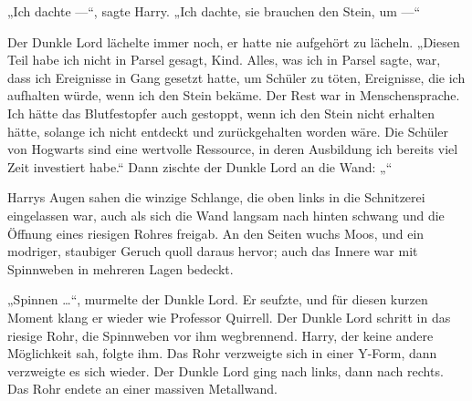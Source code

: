 „Ich dachte —“, sagte Harry.
„Ich dachte, sie brauchen den Stein, um —“

Der Dunkle Lord lächelte immer noch, er hatte nie aufgehört zu lächeln.
„Diesen Teil habe ich nicht in Parsel gesagt, Kind. Alles, was ich in Parsel sagte, war, dass ich Ereignisse in Gang gesetzt hatte, um Schüler zu töten, Ereignisse, die ich aufhalten würde, wenn ich den Stein bekäme. Der Rest war in Menschensprache. Ich hätte das Blutfestopfer auch gestoppt, wenn ich den Stein nicht erhalten hätte, solange ich nicht entdeckt und zurückgehalten worden wäre. Die Schüler von Hogwarts sind eine wertvolle Ressource, in deren Ausbildung ich bereits viel Zeit investiert habe.“
Dann zischte der Dunkle Lord an die Wand:
„“

Harrys Augen sahen die winzige Schlange, die oben links in die Schnitzerei eingelassen war, auch als sich die Wand langsam nach hinten schwang und die Öffnung eines riesigen Rohres freigab. An den Seiten wuchs Moos, und ein modriger, staubiger Geruch quoll daraus hervor; auch das Innere war mit Spinnweben in mehreren Lagen bedeckt.

„Spinnen …“, murmelte der Dunkle Lord.
Er seufzte, und für diesen kurzen Moment klang er wieder wie Professor Quirrell.
Der Dunkle Lord schritt in das riesige Rohr, die Spinnweben vor ihm wegbrennend. Harry, der keine andere Möglichkeit sah, folgte ihm.
Das Rohr verzweigte sich in einer Y-Form, dann verzweigte es sich wieder. Der Dunkle Lord ging nach links, dann nach rechts. Das Rohr endete an einer massiven Metallwand.

